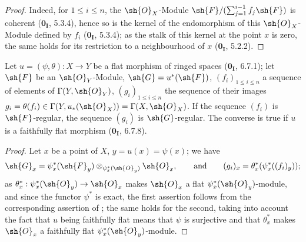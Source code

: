 \begin{proof}
Indeed, for $1\leq i\leq n$, the $\sh{O}_X$-Module $\sh{F}/(\sum_{j=1}^{i-1}f_j\sh{F})$ is coherent ($\mathbf{0_I}$, 5.3.4), hence so is the kernel of the endomorphism of this $\sh{O}_X$-Module defined by $f_i$ ($\mathbf{0_I}$, 5.3.4);
as the stalk of this kernel at the point $x$ is zero, the same holds for its restriction to a neighbourhood of $x$ ($\mathbf{0_I}$, 5.2.2).
\end{proof}

\begin{proposition}[15.2.5]
\label{0.15.2.5}
Let $u=(\psi,\theta):X\to Y$ be a flat morphism of ringed spaces ($\mathbf{0_I}$, 6.7.1);
let $\sh{F}$ be an $\sh{O}_Y$-Module, $\sh{G}=u^*(\sh{F})$, $(f_i)_{1\leq i\leq n}$ a sequence of elements of $\Gamma(Y,\sh{O}_Y)$, $(g_i)_{1\leq i\leq n}$ the sequence of their images $g_i=\theta(f_i)\in\Gamma(Y,u_*(\sh{O}_X))=\Gamma(X,\sh{O}_X)$.
If the sequence $(f_i)$ is $\sh{F}$-regular, the sequence $(g_i)$ is $\sh{G}$-regular.
The converse is true if $u$ is a faithfully flat morphism ($\mathbf{0_I}$, 6.7.8).
\end{proposition}

\begin{proof}
Let $x$ be a point of $X$, $y=u(x)=\psi(x)$;
we have
\[
  \sh{G}_x=\psi_x^*(\sh{F}_y)\otimes_{\psi_x^*(\sh{O}_y)}\sh{O}_x,
  \qquad\text{and}\qquad
  (g_i)_x=\theta_x^*(\psi_x^*((f_i)_y));
\]
as $\theta_x^*:\psi_x^*(\sh{O}_y)\to\sh{O}_x$ makes $\sh{O}_x$ a flat $\psi_x^*(\sh{O}_y)$-module, and since the functor $\psi^*$ is exact, the first assertion follows from the corresponding assertion of ;
the same holds for the second, taking into account the fact that $u$ being faithfully flat means that $\psi$ is surjective and that $\theta_x^*$ makes $\sh{O}_x$ a faithfully flat $\psi_x^*(\sh{O}_y)$-module.
\end{proof}
